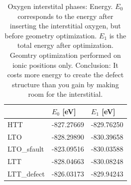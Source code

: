 \begin{table}[b]
    \centering
    \begin{tabular}{@{}lll@{}}
    \toprule
     & $E_0$ [eV] & $E_1$ [eV]            \\ \midrule
    HTT                     & -827.27669             & -829.76250 \\
    LTO                     & -828.29890             & -830.39658 \\
    LTO\_sfault              & -823.09516             & -830.03588 \\
    LTT                     & -828.04663             & -830.08248 \\
    LTT\_defect              & -826.03173             & -829.94243 \\ \bottomrule
    \end{tabular}
    \caption[Oxygen interstital phases: Energy]{Oxygen interstital phases: Energy. $E_0$ corresponds to the energy after inserting the interstitial oxygen, but before geometry optimization. $E_1$ is the total energy after optimization. Geomtry optimization performed on ionic positions only. Conclusion: It costs more energy to create the defect structure than you gain by making room for the interstitial.}
    \label{tab:oint_en}
\end{table}